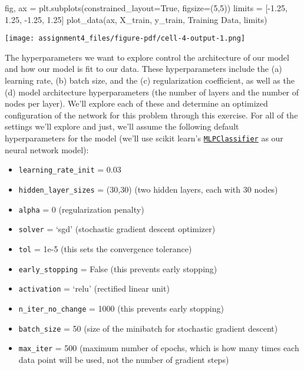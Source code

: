 \documentclass[
  letterpaper,
  DIV=11,
  numbers=noendperiod]{scrartcl}
\newenvironment{Shaded}{\begin{snugshade}}{\end{snugshade}}
\newcommand{\DecValTok}[1]{\textcolor[rgb]{0.68,0.00,0.00}{#1}}
\newcommand{\FloatTok}[1]{\textcolor[rgb]{0.68,0.00,0.00}{#1}}
\newcommand{\NormalTok}[1]{\textcolor[rgb]{0.00,0.23,0.31}{#1}}
\newcommand{\OperatorTok}[1]{\textcolor[rgb]{0.37,0.37,0.37}{#1}}
\newcommand{\StringTok}[1]{\textcolor[rgb]{0.13,0.47,0.30}{#1}}
\newcommand{\VariableTok}[1]{\textcolor[rgb]{0.07,0.07,0.07}{#1}}
\providecommand{\tightlist}{%
  \setlength{\itemsep}{0pt}\setlength{\parskip}{0pt}}\usepackage{longtable,booktabs,array}
\begin{document}
\begin{Shaded}
\begin{Highlighting}[]
\NormalTok{fig, ax }\OperatorTok{=}\NormalTok{ plt.subplots(constrained\_layout}\OperatorTok{=}\VariableTok{True}\NormalTok{, figsize}\OperatorTok{=}\NormalTok{(}\DecValTok{5}\NormalTok{,}\DecValTok{5}\NormalTok{))}
\NormalTok{limits }\OperatorTok{=}\NormalTok{ [}\OperatorTok{{-}}\FloatTok{1.25}\NormalTok{, }\FloatTok{1.25}\NormalTok{, }\OperatorTok{{-}}\FloatTok{1.25}\NormalTok{, }\FloatTok{1.25}\NormalTok{]}
\NormalTok{plot\_data(ax, X\_train, y\_train, }\StringTok{\textquotesingle{}Training Data\textquotesingle{}}\NormalTok{, limits)}
\end{Highlighting}
\end{Shaded}

\texttt{[image: assignment4\_files/figure-pdf/cell-4-output-1.png]}

The hyperparameters we want to explore control the architecture of our
model and how our model is fit to our data. These hyperparameters
include the (a) learning rate, (b) batch size, and the (c)
regularization coefficient, as well as the (d) model architecture
hyperparameters (the number of layers and the number of nodes per
layer). We'll explore each of these and determine an optimized
configuration of the network for this problem through this exercise. For
all of the settings we'll explore and just, we'll assume the following
default hyperparameters for the model (we'll use scikit learn's
\href{https://scikit-learn.org/stable/modules/generated/sklearn.neural_network.MLPClassifier.html\#sklearn.neural_network.MLPClassifier.score}{\texttt{MLPClassifier}}
as our neural network model):

\begin{itemize}
\tightlist
\item
  \texttt{learning\_rate\_init} = 0.03
\item
  \texttt{hidden\_layer\_sizes} = (30,30) (two hidden layers, each with
  30 nodes)
\item
  \texttt{alpha} = 0 (regularization penalty)
\item
  \texttt{solver} = `sgd' (stochastic gradient descent optimizer)
\item
  \texttt{tol} = 1e-5 (this sets the convergence tolerance)
\item
  \texttt{early\_stopping} = False (this prevents early stopping)
\item
  \texttt{activation} = `relu' (rectified linear unit)
\item
  \texttt{n\_iter\_no\_change} = 1000 (this prevents early stopping)
\item
  \texttt{batch\_size} = 50 (size of the minibatch for stochastic
  gradient descent)
\item
  \texttt{max\_iter} = 500 (maximum number of epochs, which is how many
  times each data point will be used, not the number of gradient steps)
\end{itemize}
\end{document}

